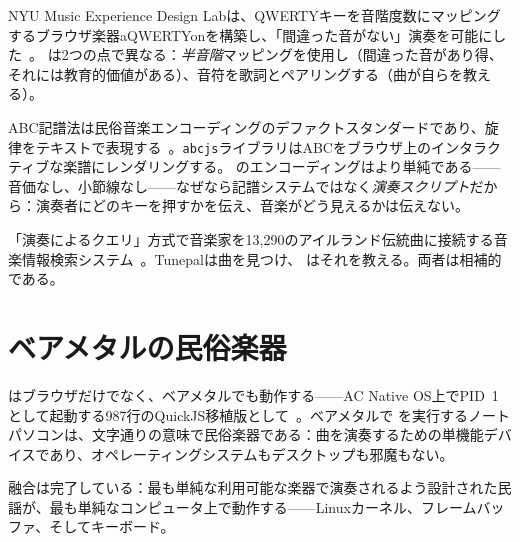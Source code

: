 \documentclass[11pt]{article}
\begin{document}
\begin{card}
NYU Music Experience Design Labは、QWERTYキーを音階度数にマッピングするブラウザ楽器aQWERTYonを構築し、「間違った音がない」演奏を可能にした~\citep{hein2017aqwertyon}。\np{} は2つの点で異なる：\emph{半音階}マッピングを使用し（間違った音があり得、それには教育的価値がある）、音符を歌詞とペアリングする（曲が自らを教える）。
\end{card}

\begin{card}
ABC記譜法は民俗音楽エンコーディングのデファクトスタンダードであり、旋律をテキストで表現する~\citep{walshaw2011abc}。\texttt{abcjs}ライブラリはABCをブラウザ上のインタラクティブな楽譜にレンダリングする。\np{} のエンコーディングはより単純である——音価なし、小節線なし——なぜなら記譜システムではなく\emph{演奏スクリプト}だから：演奏者にどのキーを押すかを伝え、音楽がどう見えるかは伝えない。
\end{card}

\begin{card}
「演奏によるクエリ」方式で音楽家を13,290のアイルランド伝統曲に接続する音楽情報検索システム~\citep{duggan2009tunepal}。Tunepalは曲を見つけ、\np{} はそれを教える。両者は相補的である。
\end{card}

\section{ベアメタルの民俗楽器}

\np{} はブラウザだけでなく、ベアメタルでも動作する——AC Native OS上でPID~1として起動する987行のQuickJS移植版として~\citep{scudder2026os}。ベアメタルで \np{} を実行するノートパソコンは、文字通りの意味で民俗楽器である：曲を演奏するための単機能デバイスであり、オペレーティングシステムもデスクトップも邪魔もない。

\begin{accentcard}
融合は完了している：最も単純な利用可能な楽器で演奏されるよう設計された民謡が、最も単純なコンピュータ上で動作する——Linuxカーネル、フレームバッファ、そしてキーボード。
\end{accentcard}

\end{document}
